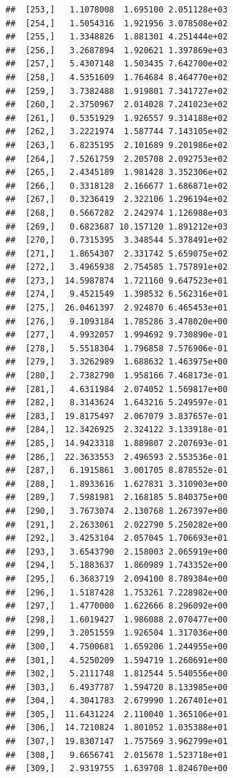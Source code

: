 \documentclass[article]{jss}\usepackage[]{graphicx}\usepackage[]{xcolor}
\makeatletter
\newenvironment{kframe}{%
 \def\at@end@of@kframe{}%
 \ifinner\ifhmode%
  \def\at@end@of@kframe{\end{minipage}}%
  \begin{minipage}{\columnwidth}%
 \fi\fi%
 \def\FrameCommand##1{\hskip\@totalleftmargin \hskip-\fboxsep
 \colorbox{shadecolor}{##1}\hskip-\fboxsep
     \hskip-\linewidth \hskip-\@totalleftmargin \hskip\columnwidth}%
 \MakeFramed {\advance\hsize-\width
   \@totalleftmargin\z@ \linewidth\hsize
   \@setminipage}}%
 {\par\unskip\endMakeFramed%
 \at@end@of@kframe}
\newenvironment{knitrout}{}{} %
\makeatother
\begin{document}
\begin{knitrout}
\begin{kframe}
\begin{verbatim}
##  [253,]   1.1078008  1.695100 2.051128e+03
##  [254,]   1.5054316  1.921956 3.078508e+02
##  [255,]   1.3348826  1.881301 4.251444e+02
##  [256,]   3.2687894  1.920621 1.397869e+03
##  [257,]   5.4307148  1.503435 7.642700e+02
##  [258,]   4.5351609  1.764684 8.464770e+02
##  [259,]   3.7382488  1.919801 7.341727e+02
##  [260,]   2.3750967  2.014028 7.241023e+02
##  [261,]   0.5351929  1.926557 9.314188e+02
##  [262,]   3.2221974  1.587744 7.143105e+02
##  [263,]   6.8235195  2.101689 9.201986e+02
##  [264,]   7.5261759  2.205708 2.092753e+02
##  [265,]   2.4345189  1.981428 3.352306e+02
##  [266,]   0.3318128  2.166677 1.686871e+02
##  [267,]   0.3236419  2.322106 1.296194e+02
##  [268,]   0.5667282  2.242974 1.126988e+03
##  [269,]   0.6823687 10.157120 1.891212e+03
##  [270,]   0.7315395  3.348544 5.378491e+02
##  [271,]   1.8654307  2.331742 5.659075e+02
##  [272,]   3.4965938  2.754585 1.757891e+02
##  [273,]  14.5987874  1.721160 9.647523e+01
##  [274,]   9.4521549  1.398532 6.562316e+01
##  [275,]  26.0461397  2.924870 6.465453e+01
##  [276,]   9.1093184  1.785286 3.478020e+00
##  [277,]   4.9932057  1.994692 9.730890e-01
##  [278,]   5.5518304  1.796858 7.576906e-01
##  [279,]   3.3262989  1.688632 1.463975e+00
##  [280,]   2.7382790  1.958166 7.468173e-01
##  [281,]   4.6311984  2.074052 1.569817e+00
##  [282,]   8.3143624  1.643216 5.249597e-01
##  [283,]  19.8175497  2.067079 3.837657e-01
##  [284,]  12.3426925  2.324122 3.133918e-01
##  [285,]  14.9423318  1.889807 2.207693e-01
##  [286,]  22.3633553  2.496593 2.553536e-01
##  [287,]   6.1915861  3.001705 8.878552e-01
##  [288,]   1.8933616  1.627831 3.310903e+00
##  [289,]   7.5981981  2.168185 5.840375e+00
##  [290,]   3.7673074  2.130768 1.267397e+00
##  [291,]   2.2633061  2.022790 5.250282e+00
##  [292,]   3.4253104  2.057045 1.706693e+01
##  [293,]   3.6543790  2.158003 2.065919e+00
##  [294,]   5.1883637  1.860989 1.743352e+00
##  [295,]   6.3683719  2.094100 8.789384e+00
##  [296,]   1.5187428  1.753261 7.228982e+00
##  [297,]   1.4770000  1.622666 8.296092e+00
##  [298,]   1.6019427  1.986088 2.070477e+00
##  [299,]   3.2051559  1.926504 1.317036e+00
##  [300,]   4.7500681  1.659206 1.244955e+00
##  [301,]   4.5250209  1.594719 1.260691e+00
##  [302,]   5.2111748  1.812544 5.540556e+00
##  [303,]   6.4937787  1.594720 8.133985e+00
##  [304,]   4.3041783  2.679990 1.267401e+01
##  [305,]  11.6431224  2.110040 1.365106e+01
##  [306,]  14.7210824  1.801052 1.035388e+01
##  [307,]  19.8307147  1.757569 3.962799e+01
##  [308,]   9.6656741  2.015678 1.523718e+01
##  [309,]   2.9319755  1.639708 1.824670e+00

\end{verbatim}
\end{kframe}
\end{knitrout}
\end{document}
